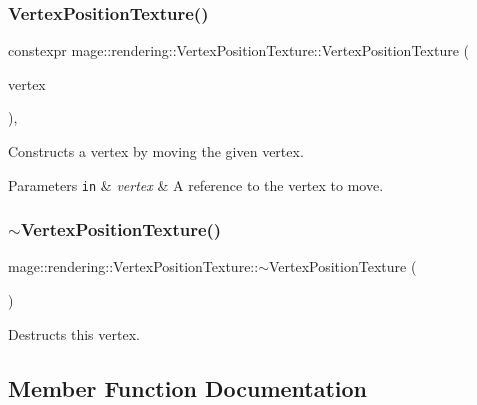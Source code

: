 \subsubsection{\texorpdfstring{Vertex\+Position\+Texture()}{VertexPositionTexture()}\hspace{0.1cm}{\footnotesize\ttfamily [4/4]}}
{\footnotesize\ttfamily constexpr mage\+::rendering\+::\+Vertex\+Position\+Texture\+::\+Vertex\+Position\+Texture (\begin{DoxyParamCaption}\item[{\mbox{\hyperlink{structmage_1_1rendering_1_1_vertex_position_texture}{Vertex\+Position\+Texture}} \&\&}]{vertex }\end{DoxyParamCaption})\hspace{0.3cm}{\ttfamily [default]}, {\ttfamily [noexcept]}}

Constructs a vertex by moving the given vertex.


\begin{DoxyParams}[1]{Parameters}
\mbox{\tt in}  & {\em vertex} & A reference to the vertex to move. \\
\hline
\end{DoxyParams}
\mbox{\label{structmage_1_1rendering_1_1_vertex_position_texture_afe6c0d05326d35c13f5d505065235691}} 
\subsubsection{\texorpdfstring{$\sim$\+Vertex\+Position\+Texture()}{~VertexPositionTexture()}}
{\footnotesize\ttfamily mage\+::rendering\+::\+Vertex\+Position\+Texture\+::$\sim$\+Vertex\+Position\+Texture (\begin{DoxyParamCaption}{ }\end{DoxyParamCaption})\hspace{0.3cm}{\ttfamily [default]}}

Destructs this vertex. 

\subsection{Member Function Documentation}
\mbox{\label{structmage_1_1rendering_1_1_vertex_position_texture_a66d7754ec7a271ec3af1883774876646}} 
